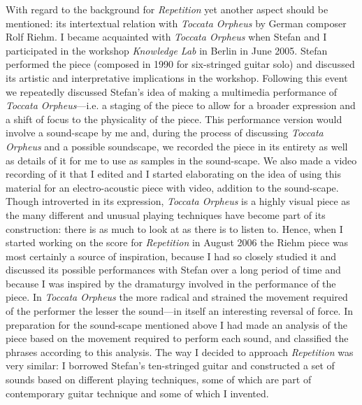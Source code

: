 
With regard to the background for \emph{Repetition} yet another aspect should be mentioned: its intertextual relation with \emph{Toccata Orpheus} by German composer Rolf Riehm. I became acquainted with \emph{Toccata Orpheus} when Stefan and I participated in the workshop \emph{Knowledge Lab} in Berlin in June 2005. Stefan performed the piece (composed in 1990 for six-stringed guitar solo) and discussed its artistic and interpretative implications in the workshop. Following this event we repeatedly discussed Stefan's idea of making a multimedia performance of \emph{Toccata Orpheus}---i.e. a staging of the piece to allow for a broader expression and a shift of focus to the physicality of the piece. This performance version would involve a sound-scape by me and, during the process of discussing \emph{Toccata Orpheus} and a possible soundscape, we recorded the piece in its entirety as well as details of it for me to use as samples in the sound-scape. We also made a video recording of it that I edited and I started elaborating on the idea of using this material for an electro-acoustic piece with video, addition to the sound-scape. Though introverted in its expression, \emph{Toccata Orpheus} is a highly visual piece as the many different and unusual playing techniques have become part of its construction: there is as much to look at as there is to listen to. Hence, when I started working on the score for \emph{Repetition} in August 2006 the Riehm piece was most certainly a source of inspiration, because I had so closely studied it and discussed its possible performances with Stefan over a long period of time and because I was inspired by the dramaturgy involved in the performance of the piece. In \emph{Toccata Orpheus} the more radical and strained the movement required of the performer the lesser the sound---in itself an interesting reversal of force. In preparation for the sound-scape mentioned above I had made an analysis of the piece based on the movement required to perform each sound, and classified the phrases according to this analysis. The way I decided to approach \emph{Repetition} was very similar: I borrowed Stefan's ten-stringed guitar and constructed a set of sounds based on different playing techniques, some of which are part of contemporary guitar technique and some of which I invented.


